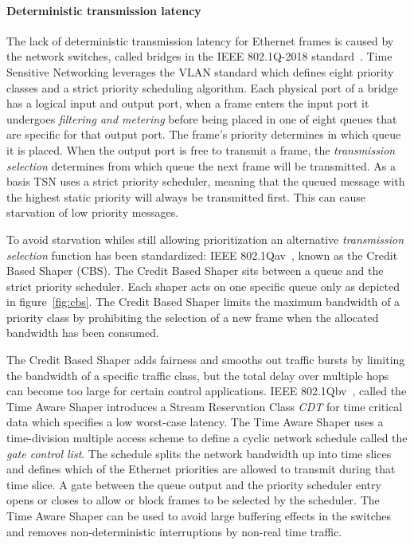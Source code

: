 \paragraph{Deterministic transmission latency} The lack of deterministic transmission latency for Ethernet frames is caused by the network switches, called bridges in the IEEE 802.1Q-2018 standard~\cite{IEEE8021Q}. Time Sensitive Networking leverages the VLAN standard which defines eight priority classes and a strict priority scheduling algorithm. Each physical port of a bridge has a logical input and output port, when a frame enters the input port it undergoes \textit{filtering and metering} before being placed in one of eight queues that are specific for that output port. The frame's priority determines in which queue it is placed. When the output port is free to transmit a frame, the \textit{transmission selection} determines from which queue the next frame will be transmitted. As a basis TSN uses a strict priority scheduler, meaning that the queued message with the highest static priority will always be transmitted first. This can cause starvation of low priority messages.

To avoid starvation whiles still allowing prioritization an alternative \textit{transmission selection} function has been standardized: IEEE 802.1Qav~\cite{IEEE8021Qav}, known as the Credit Based Shaper (CBS). The Credit Based Shaper sits between a queue and the strict priority scheduler. Each shaper acts on one specific queue only as depicted in figure~\ref{fig:cbs}. The Credit Based Shaper limits the maximum bandwidth of a priority class by prohibiting the selection of a new frame when the allocated bandwidth has been consumed. 

The Credit Based Shaper adds fairness and smooths out traffic bursts by limiting the bandwidth of a specific traffic class, but the total delay over multiple hops can become too large for certain control applications. IEEE 802.1Qbv~\cite{IEEE8021Qbv}, called the Time Aware Shaper introduces a Stream Reservation Class \textit{CDT} for time critical data which specifies a low worst-case latency. The Time Aware Shaper uses a time-division multiple access scheme to define a cyclic network schedule called the \textit{gate control list}. The schedule splits the network bandwidth up into time slices and defines which of the Ethernet priorities are allowed to transmit during that time slice. A gate between the queue output and the priority scheduler entry opens or closes to allow or block frames to be selected by the scheduler. The Time Aware Shaper can be used to avoid large buffering effects in the switches and removes non-deterministic interruptions by non-real time traffic.

